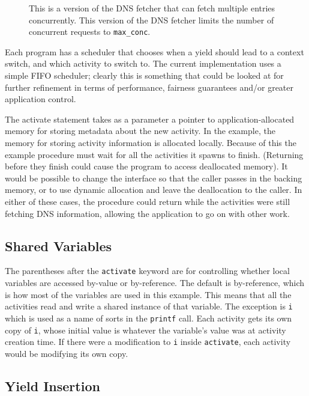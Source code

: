 \documentclass[acmsmall,anonymous,review]{acmart}\settopmatter{printfolios=true,printccs=false,printacmref=false}
\begin{document}
\begin{figure}
\begin{minipage}[t]{0.47\textwidth}
        \caption{This is a \charcoal{} version of the DNS fetcher that can fetch multiple entries concurrently.
          This version of the DNS fetcher limits the number of concurrent requests to \texttt{max\_conc}.}
        \label{fig:charcoal_multidns_sem}
    \end{minipage}
\end{figure}

Each \charcoal{} program has a scheduler that chooses when a yield should lead to a context switch, and which activity to switch to.
The current \charcoal{} implementation uses a simple FIFO scheduler; clearly this is something that could be looked at for further refinement in terms of performance, fairness guarantees and/or greater application control.

The activate statement takes as a parameter a pointer to application-allocated memory for storing metadata about the new activity.
In the example, the memory for storing activity information is allocated locally.
Because of this the example procedure must wait for all the activities it spawns to finish.
(Returning before they finish could cause the program to access deallocated memory).
It would be possible to change the interface so that the caller passes in the backing memory, or to use dynamic allocation and leave the deallocation to the caller.
In either of these cases, the procedure could return while the activities were still fetching DNS information, allowing the application to go on with other work.

\subsection{Shared Variables}

The parentheses after the \texttt{activate} keyword are for controlling whether local variables are accessed by-value or by-reference.
The default is by-reference, which is how most of the variables are used in this example.
This means that all the activities read and write a shared instance of that variable.
The exception is \texttt{i} which is used as a name of sorts in the \texttt{printf} call.
Each activity gets its own copy of \texttt{i}, whose initial value is whatever the variable's value was at activity creation time.
If there were a modification to \texttt{i} inside \texttt{activate}, each activity would be modifying its own copy.

\subsection{Yield Insertion}
\end{document}
